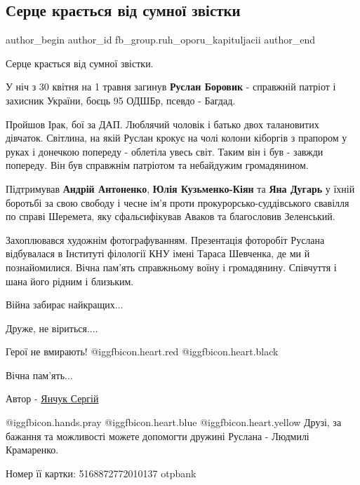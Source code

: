  
 
 
 
 
 
\subsection{Серце крається від сумної звістки}
\label{sec:01_05_2022.fb.fb_group.ruh_oporu_kapituljacii.1.smert_ruslan_borovik}
 
\ifcmt
 author_begin
   author_id fb_group.ruh_oporu_kapituljacii
 author_end
\fi

Серце крається від сумної звістки.

У ніч з 30 квітня на 1 травня загинув \textbf{Руслан Боровик} - справжній патріот і
захисник України, боєць 95 ОДШБр, псевдо - Багдад.


Пройшов Ірак, бої за ДАП. Люблячий чоловік і батько двох талановитих дівчаток.
Світлина, на якій Руслан крокує на чолі колони кіборгів з прапором у руках і
донечкою попереду - облетіла увесь світ. Таким він і був - завжди попереду. Він
був справжнім патріотом та небайдужим громадянином.

Підтримував \textbf{Андрій Антоненко}, \textbf{Юлія Кузьменко-Кіян} та \textbf{Яна Дугарь} у їхній
боротьбі за свою свободу і чесне ім'я проти прокурорсько-суддівського свавілля
по справі Шеремета, яку сфальсифікував Аваков та благословив Зеленський.


Захоплювався художнім фотографуванням. Презентація фоторобіт Руслана
відбувалася в Інституті філології КНУ імені Тараса Шевченка, де ми й
познайомилися. Вічна пам'ять справжньому воїну і громадянину. Співчуття і шана
його рідним і близьким.

Війна забирає найкращих...

Друже, не віриться....

Герої не вмирають! @igg{fbicon.heart.red}  @igg{fbicon.heart.black} 

Вічна пам'ять...

Автор - \href{https://www.facebook.com/SerhiyYanchuk}{Янчук Сергій}

@igg{fbicon.hands.pray}  @igg{fbicon.heart.blue}  @igg{fbicon.heart.yellow}
Друзі, за бажання та можливості можете допомогти дружині Руслана - Людмилі
Крамаренко.

Номер її картки: 5168872772010137 otpbank

